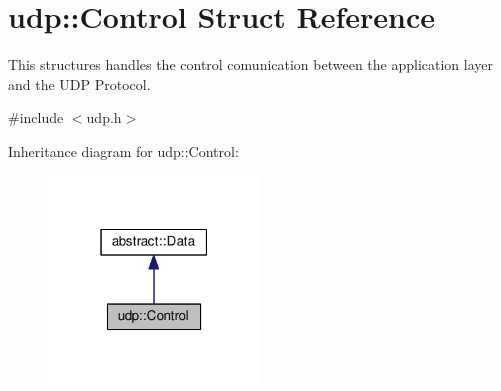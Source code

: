 \hypertarget{structudp_1_1Control}{}\section{udp\+:\+:Control Struct Reference}
\label{structudp_1_1Control}


This structures handles the control comunication between the application layer and the U\+DP Protocol.  




{\ttfamily \#include $<$udp.\+h$>$}



Inheritance diagram for udp\+:\+:Control\+:\nopagebreak
\begin{figure}[H]
\begin{center}
\leavevmode
\includegraphics[width=159pt]{structudp_1_1Control__inherit__graph}
\end{center}
\end{figure}


